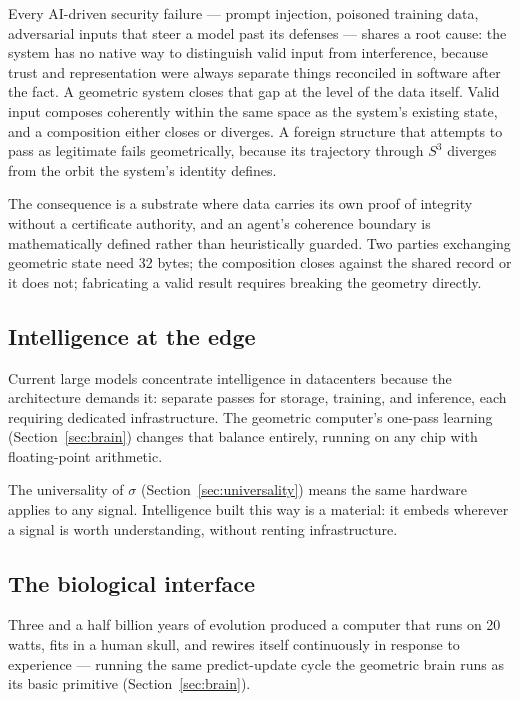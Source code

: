 \documentclass[12pt,a4paper]{article}
\theoremstyle{definition}
\theoremstyle{remark}
\begin{document}
Every AI-driven security failure --- prompt injection, poisoned training data,
adversarial inputs that steer a model past its defenses --- shares a root
cause: the system has no native way to distinguish valid input from
interference, because trust and representation were always separate things
reconciled in software after the fact. A geometric system closes that gap at
the level of the data itself. Valid input composes coherently within the same
space as the system's existing state, and a composition either closes or
diverges. A foreign structure that attempts to pass as legitimate fails
geometrically, because its trajectory through $S^3$ diverges from the orbit
the system's identity defines.

The consequence is a substrate where data carries its own proof of integrity
without a certificate authority, and an agent's coherence boundary is
mathematically defined rather than heuristically guarded. Two parties
exchanging geometric state need 32 bytes; the composition closes against the
shared record or it does not; fabricating a valid result requires breaking the geometry directly.

\subsection{Intelligence at the edge}

Current large models concentrate intelligence in datacenters because the
architecture demands it: separate passes for storage, training, and inference,
each requiring dedicated infrastructure. The geometric computer's one-pass
learning (Section~\ref{sec:brain}) changes that balance entirely, running
on any chip with floating-point arithmetic.

The universality of $\sigma$ (Section~\ref{sec:universality}) means the
same hardware applies to any signal. Intelligence built this way is a
material: it embeds wherever a signal is worth understanding, without
renting infrastructure.

\subsection{The biological interface}

Three and a half billion years of evolution produced a computer that runs
on 20 watts, fits in a human skull, and rewires itself continuously in
response to experience --- running the same predict-update cycle the geometric
brain runs as its basic primitive (Section~\ref{sec:brain}).
\end{document}
